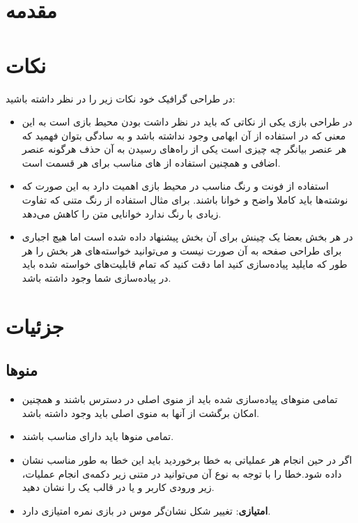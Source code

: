 \documentclass[]{article}
\begin{document}
\newpage

\section*{{\titr مقدمه}}

\section*{{\titr نکات}}
در طراحی گرافیک خود نکات زیر را در نظر داشته باشید:

\begin{itemize}
    \item در طراحی بازی یکی از نکاتی که باید در نظر داشت  بودن محیط بازی است به این معنی که در استفاده از آن ابهامی وجود نداشته باشد و به سادگی بتوان فهمید که هر عنصر بیانگر چه چیزی است یکی از را‌ه‌های رسیدن به آن حذف هرگونه عنصر اضافی و همچنین استفاده از  های مناسب برای هر قسمت است.
    \item استفاده از فونت و رنگ مناسب در محیط بازی اهمیت دارد به این صورت که نوشته‌ها باید کاملا واضح و خوانا باشند. برای مثال استفاده از رنگ متنی که تفاوت زیادی با رنگ  ندارد خوانایی متن را کاهش می‌دهد.
    \item در هر بخش بعضا یک چینش برای آن بخش پیشنهاد داده شده است اما هیچ اجباری برای طراحی صفحه به آن صورت نیست و می‌توانید خواسته‌های هر بخش را هر طور که مایلید پیاده‌سازی کنید اما دقت کنید که تمام قابلیت‌های خواسته شده باید در پیا‌ده‌سازی شما وجود داشته باشد.
\end{itemize}

\section*{{\titr جزئیات}}

\subsection*{{\titr منوها}}

\begin{itemize}
    \item تمامی منو‌های پیاده‌سازی شده باید از منوی‌ اصلی در دسترس باشند و همچنین امکان برگشت از آنها به منوی اصلی باید وجود داشته باشد.
    \item تمامی‌ منو‌ها باید دارای  مناسب باشند.
    \item اگر در حین انجام هر عملیاتی به خطا برخوردید باید این خطا به طور مناسب نشان داده شود.خطا را با توجه به نوع آن می‌توانید در متنی زیر دکمه‌ی انجام عملیات،  زیر  ورودی کاربر و یا در قالب  یک  را نشان دهید.
    \item \textbf{امتیازی}: تغییر شکل نشان‌گر موس در بازی نمره امتیازی دارد. 
\end{itemize}
\end{document}
